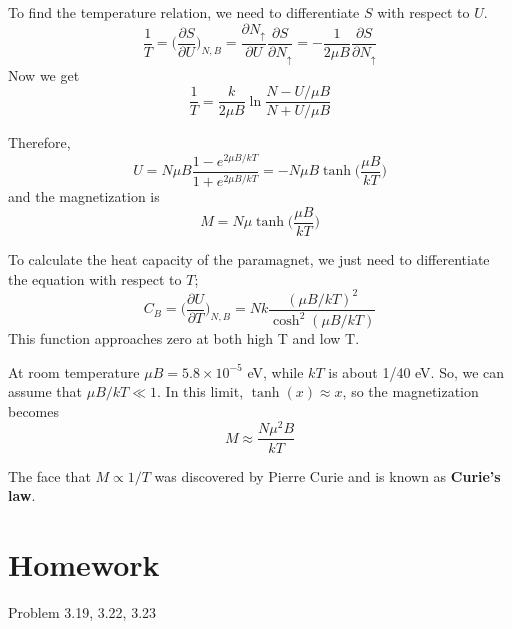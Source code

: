 To find the temperature relation, we need to differentiate $S$ with respect to $U$.
\begin{equation}
 \frac{1}{T} = \bigg(\frac{\partial S}{\partial U}\bigg)_{N, B} 
             = \frac{\partial N_\uparrow}{\partial U} \frac{\partial S}{\partial N_\uparrow} 
             = -\frac{1}{2\mu B}\frac{\partial S}{\partial N_\uparrow}    
\end{equation}
Now we get
\begin{equation}
    \frac{1}{T} = \frac{k}{2\mu B} \ln \frac{N-U/\mu B}{N+U/\mu B}
\end{equation}

Therefore, 
\begin{equation}
    U = N\mu B\frac{1-e^{2\mu B/kT}}{1+e^{2\mu B/kT}} = -N\mu B\tanh \bigg({\frac{\mu B}{kT}}\bigg)
\end{equation}
and the magnetization is
\begin{equation}
    M = N\mu\tanh \bigg({\frac{\mu B}{kT}}\bigg)
\end{equation}



To calculate the heat capacity of the paramagnet, we just need to differentiate the equation with respect to $T$;
\begin{equation}
    C_B = \bigg(\frac{\partial U}{\partial T}\bigg)_{N, B} = Nk \frac{(\mu B/kT)^2}{\cosh^2(\mu B/kT)}
\end{equation}
This function approaches zero at both high T and low T. 

At room temperature $\mu B = 5.8 \times 10^{-5}$ eV, while $kT$ is about 1/40 eV. So, we can assume that $\mu B/kT \ll 1$. In this limit, $\tanh(x) \approx x$, so the magnetization becomes 
\begin{equation}
    M \approx \frac{N\mu^2B}{kT}
\end{equation}

The face that $M \propto 1/T$ was discovered by Pierre Curie and is known as \textbf{Curie's law}. 


\section{Homework}
Problem 3.19, 3.22, 3.23
